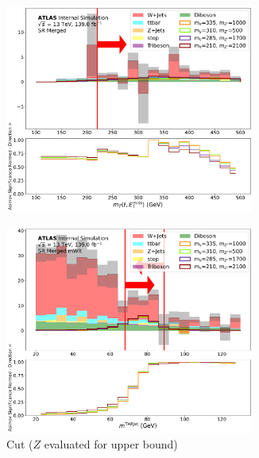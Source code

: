 \begin{figure}[htbp]
  \centering
    \begin{subfigure}[t]{0.48\textwidth}
    \centering
     \includegraphics[width = 0.9\textwidth]{Figures/5/SR1L_Merged/mT_lep_met_normSig_N_1.pdf}
    \caption{\mtlepmet}
    \end{subfigure}
    \begin{subfigure}[t]{0.48\textwidth}
    \centering
     \includegraphics[width = 0.9\textwidth]{Figures/5/SR1L_Merged_mWlt/TARJets10_mTAR0_normSig_N_1.pdf}
     \caption{\mTAR Cut (\(Z\) evaluated for upper bound)}
    \end{subfigure}
    \begin{subfigure}[t]{0.48\textwidth}

\end{subfigure}
\end{figure}
